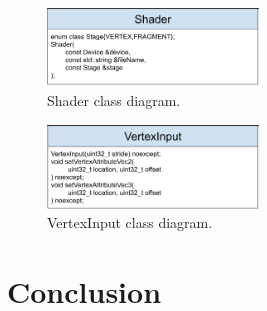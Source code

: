 \documentclass[12pt]{report}
\newcommand{\figurewidth}{0.6\textwidth}
\newcommand{\imagewidth}{0.5\textwidth}
\theoremstyle{definition}
\begin{document}
  \begin{figure}
    \centering
    \includegraphics[width=\imagewidth]{images/class_shader.png}
    \caption{Shader class diagram.}
    \label{fig:class_shader}
  \end{figure}

  \begin{figure}
    \centering
    \includegraphics[width=\imagewidth]{images/class_vertexinput.png}
    \caption{VertexInput class diagram.}
    \label{fig:class_vertexinput}
  \end{figure}

  \chapter{Conclusion}
\end{document}
